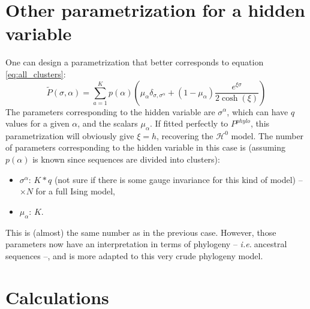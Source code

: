 \documentclass[10pt]{article}
\newcommand{\ie}{\emph{i.e.}$\;$}
\begin{document}
	

	\section{Other parametrization for a hidden variable} %
	\label{sec:other_parametrization_for_a_hidden_variable}

	One can design a parametrization that better corresponds to equation \ref{eq:all_clusters}:
	\begin{equation}
		\label{eq:HN_better}
		\tilde{P}(\sigma,\alpha) = \sum_{a=1}^K p(\alpha)\left( \mu_\alpha \delta_{\sigma,\sigma^\alpha} + (1-\mu_\alpha)\frac{e^{\xi\sigma}}{2\cosh(\xi)}\right)
	\end{equation}
	The parameters corresponding to the hidden variable are $\sigma^\alpha$, which can have $q$ values for a given $\alpha$, and the scalars $\mu_\alpha$. If fitted perfectly to $P^{phylo}$, this parametrization will obviously give $\xi=h$, recovering the $\mathcal{H}^0$ model. The number of parameters corresponding to the hidden variable in this case is (assuming $p(\alpha)$ is known since sequences are divided into clusters): 
	\begin{itemize}
		\item $\sigma^\alpha$: $K*q$ (not sure if there is some gauge invariance for this kind of model) -- $\times N$ for a full Ising model,
		\item $\mu_\alpha$: $K$.
	\end{itemize}
	This is (almost) the same number as in the previous case. However, those parameters now have an interpretation in terms of phylogeny -- \ie ancestral sequences --, and is more adapted to this very crude phylogeny model.
	

	\section{Calculations} %
	\label{sec:calculations}
	
\end{document}
